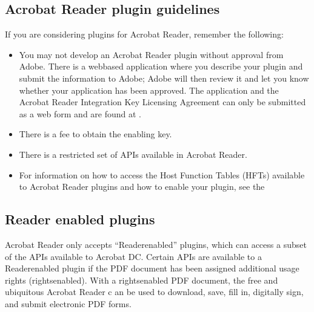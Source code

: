 \documentclass[letterpaper,12pt,english,openany,oneside]{sphinxmanual}
\begin{document}
\subsection{Acrobat Reader plug\sphinxhyphen{}in guidelines}
\label{\detokenize{index:acrobat-reader-plug-in-guidelines}}
If you are considering plug\sphinxhyphen{}ins for Acrobat Reader, remember the following:
\begin{itemize}
\item {} 
You may not develop an Acrobat Reader plug\sphinxhyphen{}in without approval from Adobe. There is a web\sphinxhyphen{}based application where you describe your plug\sphinxhyphen{}in and submit the information to Adobe; Adobe will then review it and let you know whether your application has been approved. The application and the Acrobat Reader Integration Key Licensing Agreement can only be submitted as a web form and are found at  .

\item {} 
There is a fee to obtain the enabling key.

\item {} 
There is a restricted set of APIs available in Acrobat Reader.

\item {} 
For information on how to access the Host Function Tables (HFTs) available to Acrobat Reader plug\sphinxhyphen{}ins and how to enable your plugin, see the 

\end{itemize}


\subsection{Reader enabled plugins}
\label{\detokenize{index:reader-enabled-plugins}}
Acrobat Reader only accepts “Reader\sphinxhyphen{}enabled” plug\sphinxhyphen{}ins, which can access a subset of the APIs available to Acrobat DC. Certain APIs are available to a Reader\sphinxhyphen{}enabled plug\sphinxhyphen{}in if the PDF document has been assigned additional usage rights (rights\sphinxhyphen{}enabled). With a rights\sphinxhyphen{}enabled PDF document, the free and ubiquitous Acrobat Reader c an be used to download, save, fill in, digitally sign, and submit electronic PDF forms.
\end{document}
